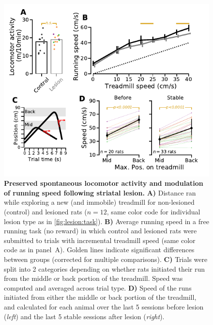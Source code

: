 \begin{figure}[bth!]
	\begin{center}
		\includegraphics[scale=1]{ch-lesion/figures/MotorPreserved.pdf}
		\caption[Preserved Motor Control After Striatal Lesion]
		{\textbf{Preserved spontaneous locomotor activity and modulation of running speed following striatal lesion.}
		\textbf{A)} Distance ran while exploring a new (and immobile) treadmill for non-lesioned (control) and lesioned rats ($n=12$, same color code for individual lesion type as in \autoref{fig:lesion:task}).
		\textbf{B)} Average running speed in a free running task (no reward) in which control and lesioned rats were submitted to trials with incremental treadmill speed (same color code as in panel~A).
		Golden lines indicate significant differences between groups (corrected for multiple comparisons).
		\textbf{C)} Trials were split into 2 categories depending on whether rats initiated their run from the middle or back portion of the treadmill.
		Speed was computed and averaged across trial type.
		\textbf{D)} Speed of the runs initiated from either the middle or back portion of the treadmill, and calculated for each animal over the last 5 sessions before lesion (\textit{left}) and the last 5 stable sessions after lesion (\textit{right}).
		}
		\label{fig:lesion:motorOk}
	\end{center}
\end{figure}